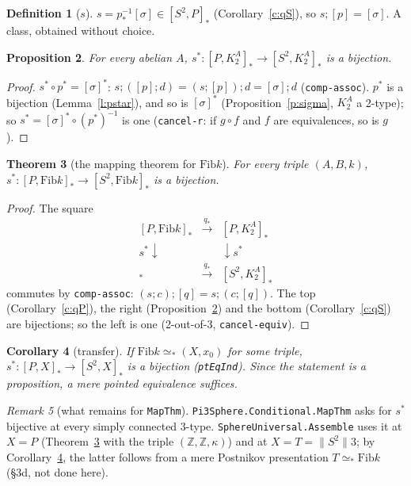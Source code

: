 \documentclass[11pt]{amsart}
\newtheorem{theorem}{Theorem}
\newtheorem{proposition}[theorem]{Proposition}
\newtheorem{corollary}[theorem]{Corollary}
\theoremstyle{definition}
\newtheorem{definition}[theorem]{Definition}
\theoremstyle{remark}
\newtheorem{remark}[theorem]{Remark}
\newcommand{\Z}{\mathbb{Z}}
\newcommand{\code}[1]{\texttt{#1}}
\newcommand{\hc}[2]{[#1,#2]_*}
\newcommand{\Fib}{\mathrm{Fib}}
\newcommand{\tr}[1]{\|#1\|}
\newcommand{\cls}[1]{[#1]}
\begin{document}
\begin{definition}[$s$]\label{d:s}
$s=p_*^{-1}\cls\sigma\in\hc{S^2}P$ (Corollary~\ref{c:qS}), so
$s;\cls p=\cls\sigma$. A class, obtained without choice.
\end{definition}

\begin{proposition}\label{p:right}
For every abelian $A$, $s^*:\hc P{K^A_2}\to\hc{S^2}{K^A_2}$ is a bijection.
\end{proposition}
\begin{proof}
$s^*\circ p^*=\cls\sigma^*$: $s;(\cls p;d)=(s;\cls p);d=\cls\sigma;d$
(\code{comp-assoc}). $p^*$ is a bijection (Lemma~\ref{l:pstar}), and so
is $\cls\sigma^*$ (Proposition~\ref{p:sigma}, $K^A_2$ a 2-type); so
$s^*=\cls\sigma^*\circ(p^*)^{-1}$ is one (\code{cancel-r}: if $g\circ f$
and $f$ are equivalences, so is $g$).
\end{proof}

\begin{theorem}[the mapping theorem for $\Fib k$]\label{t:main}
For every triple $(A,B,k)$, $s^*:\hc P{\Fib k}\to\hc{S^2}{\Fib k}$ is a
bijection.
\end{theorem}
\begin{proof}
The square
\[\begin{array}{ccc}
\hc P{\Fib k} & \xrightarrow{\ q_*\ } & \hc P{K^A_2}\\
{\scriptstyle s^*}\downarrow & & \downarrow{\scriptstyle s^*}\\
\hc{S^2}{\Fib k} & \xrightarrow{\ q_*\ } & \hc{S^2}{K^A_2}
\end{array}\]
commutes by \code{comp-assoc}: $(s;c);\cls q=s;(c;\cls q)$. The top
(Corollary~\ref{c:qP}), the right (Proposition~\ref{p:right}) and the
bottom (Corollary~\ref{c:qS}) are bijections; so the left is one
(2-out-of-3, \code{cancel-equiv}).
\end{proof}

\begin{corollary}[transfer]\label{c:transfer}
If $\Fib k\simeq_*(X,x_0)$ for some triple, $s^*:\hc PX\to\hc{S^2}X$ is
a bijection (\code{ptEqInd}). Since the statement is a proposition, a
\emph{mere} pointed equivalence suffices.
\end{corollary}

\begin{remark}[what remains for \code{MapThm}]
\code{Pi3Sphere.Conditional.MapThm} asks for $s^*$ bijective at every
simply connected 3-type. \code{SphereUniversal.Assemble} uses it at
$X=P$ (Theorem~\ref{t:main} with the triple $(\Z,\Z,\kappa)$) and at
$X=T=\tr{S^2}3$; by Corollary~\ref{c:transfer}, the latter follows from a
mere Postnikov presentation $T\simeq_*\Fib k$ (\S3d, not done here).
\end{remark}
\end{document}
